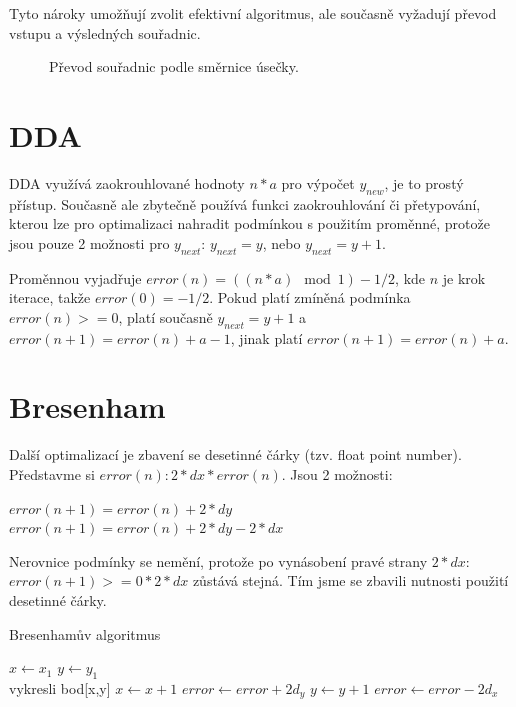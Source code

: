 \documentclass[a4paper,12pt]{report}
\begin{document}
Tyto nároky umožňují zvolit efektivní algoritmus, ale současně vyžadují převod vstupu a výsledných souřadnic.\\

\begin{figure}[H]
  \centering
  
  \caption{Převod souřadnic podle směrnice úsečky.}
\end{figure}




\section{DDA}
DDA využívá zaokrouhlované hodnoty $n*a$ pro výpočet $y_{new}$, je to prostý přístup. Současně ale zbytečně používá funkci zaokrouhlování či přetypování, kterou lze pro optimalizaci nahradit podmínkou s použitím proměnné,
protože jsou pouze 2 možnosti pro $y_{next}$: $y_{next} = y$, nebo $y_{next} = y+1$.

Proměnnou vyjadřuje $error(n)=((n*a)\mod1)-1/2$, kde $n$ je krok iterace, takže $error(0) = -1/2$.
Pokud platí zmíněná podmínka $error(n) >= 0$, platí současně $y_{next}=y+1$ a $error(n+1) = error(n) + a - 1$, jinak platí $error(n+1) = error(n) + a$.


\section{Bresenham}

\begin{multicols}{2}
\cite{usecka_bresenham} Další optimalizací je zbavení se desetinné čárky (tzv. float point number).
Představme si $error(n) : 2*dx*error(n)$. Jsou 2 možnosti:

\noindent$error(n+1)=error(n)+2*dy$\\
$error(n+1)=error(n)+2*dy-2*dx$

Nerovnice podmínky se nemění, protože po vynásobení pravé strany $2*dx$: $error(n+1)>=0*2*dx$ zůstává stejná.
Tím jsme se zbavili nutnosti použití desetinné čárky.




\begin{algorithm}[H]
\caption{Bresenhamův algoritmus}
\begin{algorithmic}
\State $x \gets x_1$
\State $y \gets y_1$
\\vykresli bod[x,y]
\State $x \gets x + 1$
\State $error \gets error + 2d_y$
    \State $y \gets y + 1$
    \State $error \gets error - 2d_x$
\EndIf 
\EndWhile
\end{algorithmic}
\end{algorithm}
\end{multicols}
\pagebreak
\end{document}
